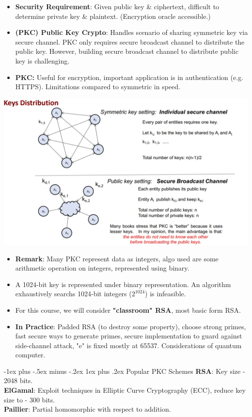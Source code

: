 \documentclass[10pt, landscape]{article}
\makeatletter
\renewcommand{\subsubsection}{\@startsection{subsubsection}{3}{0mm}%
                                {-1ex plus -.5ex minus -.2ex}%
                                {1ex plus .2ex}%
                                {\normalfont\small\bfseries}}
\makeatother
\begin{document}
\begin{multicols*}{3}
\begin{itemize}
\item \textbf{Security Requirement}: Given public key \& ciphertext, difficult to determine private key \& plaintext. (Encryption oracle accessible.)
\item \textbf{(PKC) Public Key Crypto}: Handles scenario of sharing symmetric key via secure channel. PKC only requires secure broadcast channel to distribute the public key. However, building secure broadcast channel to distribute public key is challenging.
\item \textbf{PKC:} Useful for encryption, important application is in authentication (e.g. HTTPS). Limitations compared to symmetric in speed.
\end{itemize}
\centerline{\includegraphics[width=1\linewidth]{keyDistribution}}
\begin{itemize}
\item \textbf{Remark}: Many PKC represent data as integers, algo used are some arithmetic operation on integers, represented using binary.
\item A 1024-bit key is represented under binary representation. An algorithm exhaustively searchs 1024-bit integers ($2^{1024}$) is infeasible.
\item For this course, we will consider \textbf{"classroom" RSA}, most basic form RSA.
\item \textbf{In Practice}: Padded RSA (to destroy some property), choose strong primes, fast secure ways to generate primes, secure implementation to guard against side-channel attack, "e" is fixed mostly at 65537. Considerations of quantum computer.
\end{itemize}

\subsubsection{Popular PKC Schemes}
\textbf{RSA}: Key size - 2048 bits. \\
\textbf{ElGamal}: Exploit techniques in Elliptic Curve Cryptography (ECC), reduce key size to - 300 bits. \\
\textbf{Paillier}: Partial homomorphic with respect to addition.




\end{multicols*}
\end{document}
